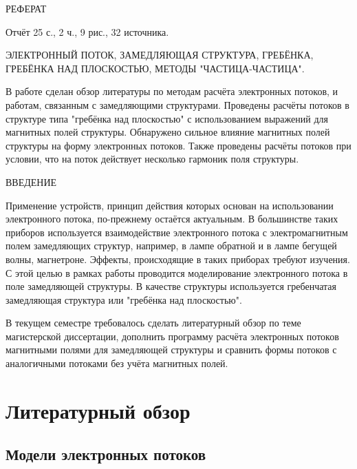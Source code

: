 \documentclass[a4paper,14pt]{extreport} %
\begin{document}
\setcounter{page}{2}

\begin{center}
	\MakeUppercase{Реферат}
\end{center}

Отчёт 25 с., 2 ч., 9 рис., 32 источника.

\MakeUppercase{электронный поток, замедляющая структура, гребёнка, гребёнка над плоскостью, методы "частица-частица".}

В работе сделан обзор литературы по методам расчёта электронных потоков, и работам, связанным с замедляющими структурами. Проведены расчёты потоков в структуре типа "гребёнка над плоскостью" с использованием выражений для магнитных полей структуры. Обнаружено сильное влияние магнитных полей структуры на форму электронных потоков. Также проведены расчёты потоков при условии, что на поток действует несколько гармоник поля структуры.

\newpage

\tableofcontents

\newpage


\begin{center}
	\MakeUppercase{Введение}
\end{center}

Применение устройств, принцип действия которых основан на использовании электронного потока, по-прежнему остаётся актуальным. В большинстве таких приборов используется взаимодействие электронного потока с электромагнитным полем замедляющих структур, например, в лампе обратной и в лампе бегущей волны, магнетроне. Эффекты, происходящие в таких приборах требуют изучения. С этой целью в рамках работы проводится моделирование электронного потока в поле замедляющей структуры. В качестве структуры используется гребенчатая замедляющая структура или "гребёнка над плоскостью".

В текущем семестре требовалось сделать литературный обзор по теме магистерской диссертации, дополнить программу расчёта электронных потоков магнитными полями для замедляющей структуры и сравнить формы потоков с аналогичными потоками без учёта магнитных полей.

\newpage

\chapter{Литературный обзор}
\section{Модели электронных потоков}
\end{document}
